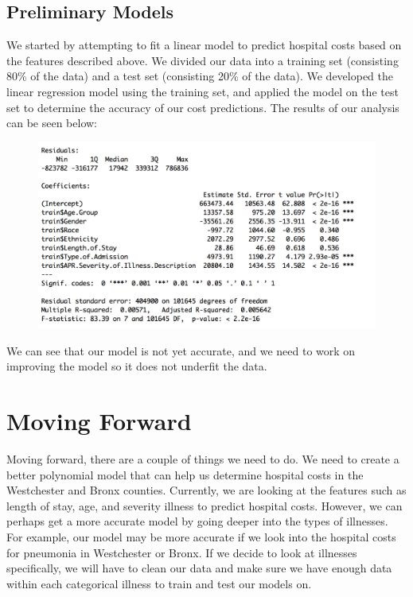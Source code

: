 \documentclass{article}
\begin{document}
\subsection{Preliminary Models}

We started by attempting to fit a linear model to predict hospital costs based on the features described above. We divided our data into a training set (consisting 80\% of the data) and a test set (consisting 20\% of the data). We developed the linear regression model using the training set, and applied the model on the test set to determine the accuracy of our cost predictions. The results of our analysis can be seen below:

\begin{figure}[h]
\centering
  \includegraphics[width=12cm]{results.png}
  \label{fig:boat1}
\end{figure}

We can see that our model is not yet accurate, and we need to work on improving the model so it does not underfit the data.


\section{Moving Forward}
Moving forward, there are a couple of things we need to do. We need to create a better polynomial model that can help us determine hospital costs in the Westchester and Bronx counties. Currently, we are looking at the features such as length of stay, age, and severity illness to predict hospital costs. However, we can perhaps get a more accurate model by going deeper into the types of illnesses. For example, our model may be more accurate if we look into the hospital costs for pneumonia in Westchester or Bronx. If we decide to look at illnesses specifically, we will have to clean our data and make sure we have enough data within each categorical illness to train and test our models on.  
\end{document}

